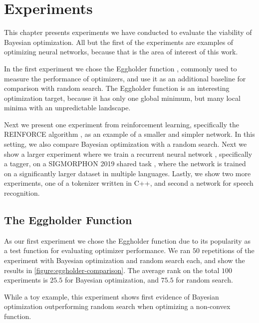\chapter{Experiments}
\label{chapter:experiments}

This chapter presents experiments we have conducted to evaluate the viability of Bayesian optimization. All but the first of the experiments are examples of optimizing neural networks, because that is the area of interest of this work.

In the first experiment we chose the Eggholder function \citep{eggholder}, commonly used to measure the performance of optimizers, and use it as an additional baseline for comparison with random search. The Eggholder function is an interesting optimization target, because it has only one global minimum, but many local minima with an unpredictable landscape.

Next we present one experiment from reinforcement learning, specifically the REINFORCE algorithm \citep{suttonbarto2018reinforcement}, as an example of a smaller and simpler network. In this setting, we also compare Bayesian optimization with a random search. Next we show a larger experiment where we train a recurrent neural network \citep{dlbook}, specifically a tagger, on a SIGMORPHON 2019 shared task \citep{sigmorphon2019task2}, where the network is trained on a significantly larger dataset in multiple languages. Lastly, we show two more experiments, one of a tokenizer written in C++, and second a network for speech recognition.

\section{The Eggholder Function}

As our first experiment we chose the Eggholder function \cite{eggholder} due to its popularity as a test function for evaluating optimizer performance. We ran $50$ repetitions of the experiment with Bayesian optimization and random search each, and show the results in \autoref{figure:eggholder-comparison}. The average rank on the total $100$ experiments is $25.5$ for Bayesian optimization, and $75.5$ for random search.

While a toy example, this experiment shows first evidence of Bayesian optimization outperforming random search when optimizing a non-convex function.

